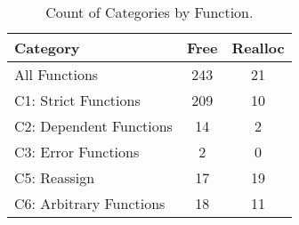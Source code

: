 \begin{table}[H]
   \begin{center}
   \begin{tabularx}{0.6\linewidth}{l|c|c}

      Category & Free & Realloc \\
      \hline

      All Functions& 243 & 21 \\

      C1: Strict Functions& 209 & 10 \\

      C2: Dependent Functions& 14 & 2 \\

      C3: Error Functions& 2 & 0 \\

      C5: Reassign& 17 & 19 \\

      C6: Arbitrary Functions& 18 & 11 \\

   \end{tabularx}
\end{center}
   \caption{Count of Categories by Function.}
   \label{tab:categories:overview}
\end{table}

